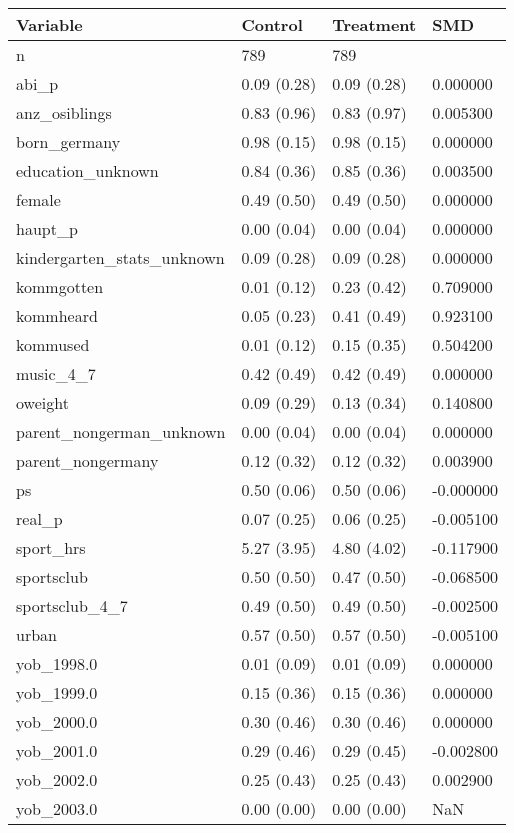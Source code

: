 \begin{tabular}{llll}
\toprule
Variable & Control & Treatment & SMD \\
\midrule
n & 789 & 789 &  \\
abi\_p & 0.09 (0.28) & 0.09 (0.28) & 0.000000 \\
anz\_osiblings & 0.83 (0.96) & 0.83 (0.97) & 0.005300 \\
born\_germany & 0.98 (0.15) & 0.98 (0.15) & 0.000000 \\
education\_unknown & 0.84 (0.36) & 0.85 (0.36) & 0.003500 \\
female & 0.49 (0.50) & 0.49 (0.50) & 0.000000 \\
haupt\_p & 0.00 (0.04) & 0.00 (0.04) & 0.000000 \\
kindergarten\_stats\_unknown & 0.09 (0.28) & 0.09 (0.28) & 0.000000 \\
kommgotten & 0.01 (0.12) & 0.23 (0.42) & 0.709000 \\
kommheard & 0.05 (0.23) & 0.41 (0.49) & 0.923100 \\
kommused & 0.01 (0.12) & 0.15 (0.35) & 0.504200 \\
music\_4\_7 & 0.42 (0.49) & 0.42 (0.49) & 0.000000 \\
oweight & 0.09 (0.29) & 0.13 (0.34) & 0.140800 \\
parent\_nongerman\_unknown & 0.00 (0.04) & 0.00 (0.04) & 0.000000 \\
parent\_nongermany & 0.12 (0.32) & 0.12 (0.32) & 0.003900 \\
ps & 0.50 (0.06) & 0.50 (0.06) & -0.000000 \\
real\_p & 0.07 (0.25) & 0.06 (0.25) & -0.005100 \\
sport\_hrs & 5.27 (3.95) & 4.80 (4.02) & -0.117900 \\
sportsclub & 0.50 (0.50) & 0.47 (0.50) & -0.068500 \\
sportsclub\_4\_7 & 0.49 (0.50) & 0.49 (0.50) & -0.002500 \\
urban & 0.57 (0.50) & 0.57 (0.50) & -0.005100 \\
yob\_1998.0 & 0.01 (0.09) & 0.01 (0.09) & 0.000000 \\
yob\_1999.0 & 0.15 (0.36) & 0.15 (0.36) & 0.000000 \\
yob\_2000.0 & 0.30 (0.46) & 0.30 (0.46) & 0.000000 \\
yob\_2001.0 & 0.29 (0.46) & 0.29 (0.45) & -0.002800 \\
yob\_2002.0 & 0.25 (0.43) & 0.25 (0.43) & 0.002900 \\
yob\_2003.0 & 0.00 (0.00) & 0.00 (0.00) & NaN \\
\bottomrule
\end{tabular}
